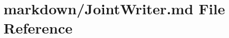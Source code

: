 \hypertarget{JointWriter_8md}{\section{markdown/\-Joint\-Writer.md File Reference}
\label{JointWriter_8md}
}
